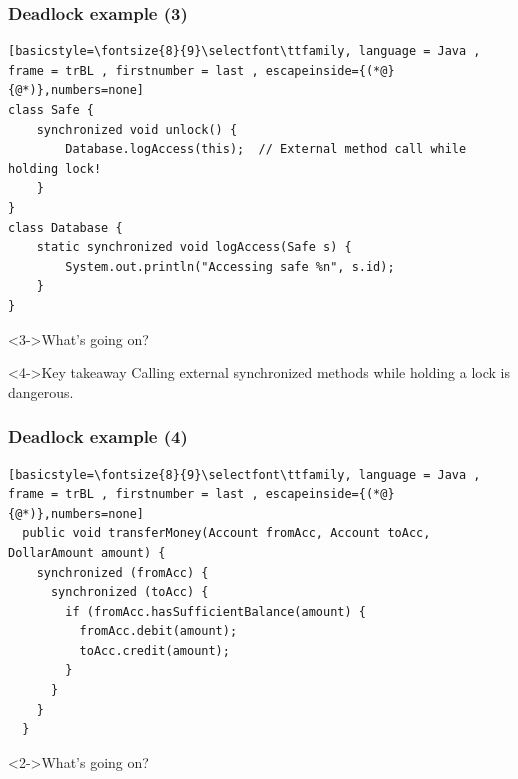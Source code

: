 \documentclass[xcolor={dvipsnames,svgnames},aspectratio=169]{beamer}
\begin{document}
\begin{frame}[fragile]
  \frametitle{\faSkull \quad Deadlock example (3)}

\begin{lstlisting}[basicstyle=\fontsize{8}{9}\selectfont\ttfamily, language = Java ,
frame = trBL , firstnumber = last , escapeinside={(*@}{@*)},numbers=none]
class Safe {
    synchronized void unlock() {
        Database.logAccess(this);  // External method call while holding lock!
    }
}
class Database {
    static synchronized void logAccess(Safe s) {
        System.out.println("Accessing safe %n", s.id);
    }
}
\end{lstlisting}



  \begin{block}<3->{\faPuzzlePiece \quad What's going on?}
  \end{block}

  \begin{block}<4->{\faLightbulb \quad Key takeaway}
    Calling external synchronized methods while holding a lock is dangerous.
  \end{block}

\end{frame}

\begin{frame}[fragile]
  \frametitle{\faSkull \quad Deadlock example (4)}

\begin{lstlisting}[basicstyle=\fontsize{8}{9}\selectfont\ttfamily, language = Java ,
frame = trBL , firstnumber = last , escapeinside={(*@}{@*)},numbers=none]
  public void transferMoney(Account fromAcc, Account toAcc, DollarAmount amount) {
    synchronized (fromAcc) {
      synchronized (toAcc) {
        if (fromAcc.hasSufficientBalance(amount) {
          fromAcc.debit(amount);
          toAcc.credit(amount);
        }
      }
    }
  }
\end{lstlisting}

  \begin{block}<2->{\faPuzzlePiece \quad What's going on?}
  \end{block}
\end{frame}
\end{document}
